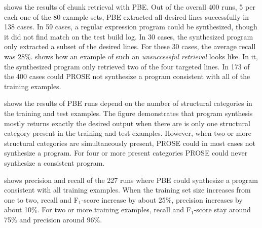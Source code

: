  shows the results of chunk
retrieval with PBE.
Out of the overall 400 runs, 5 per each one of the 80 example
sets, PBE extracted all desired lines successfully in 138 cases.
In 59 cases, a regular expression program could be synthesized, though
it did not find match on the test build log.
In 30 cases, the synthesized program only extracted a
subset of the desired lines.
For these 30 cases, the average recall
was 28\%.
 shows how an example of such
an \emph{unsuccessful retrieval} looks like. In it, the synthesized program only
retrieved two of the four targeted lines.
In 173 of the 400 cases
could PROSE not synthesize a program consistent with all of the training
examples.


 shows the results of PBE
runs depend on the number of structural categories in the training and
test examples.
The figure demonstrates that program synthesis mostly
returns exactly the desired output when there are is only one
structural category present in the training and test examples.
However, when
two or more structural categories are simultaneously present,
PROSE could in most cases not synthesize a program.
For four or more present
categories PROSE could never synthesize a consistent program.

 shows
precision and recall of the 227 runs where PBE could synthesize a
program consistent with all training examples.
When the training set
size increases from one to two, recall and F$_{1}$-score increase by
about 25\%, precision increases by about 10\%.
For two or more
training examples, recall and F$_{1}$-score stay around 75\% and
precision around 96\%.

